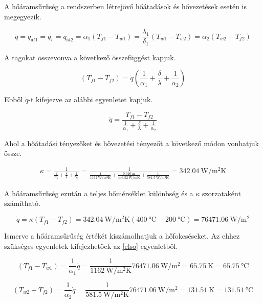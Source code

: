 \noindent A hőáramsűrűség a rendszerben létrejövő hőátadások és hővezetések esetén is megegyezik. 

\begin{equation}\label{elso}
\dot{q}=\dot{q}_{\textit{át1}} =\dot{q_v}=\dot{q}_{\textit{át2}}=\alpha_1 (T_{f1}-T_{w1})= \frac{\lambda_1}{\delta_1} (T_{w1} - T_{w2}) = \alpha_2 (T_{w2}-T_{f2})
\end{equation} 

\noindent A tagokat összevonva a következő összefüggést kapjuk.

\begin{equation}
(T_{f1}-T_{f2})=\dot{q}(\frac{1}{\alpha_1}+\frac{\delta}{\lambda}+\frac{1}{\alpha_2})
\end{equation} 

\noindent Ebből $\dot{q}$-t kifejezve az alábbi egyenletet kapjuk.

\begin{equation}
\dot{q}=\frac{T_{f1}-T_{f2}}{\frac{1}{\alpha_1}+\frac{\delta}{\lambda}+\frac{1}{\alpha_2}}
\end{equation} 

\noindent Ahol a hőátadási tényezőket és hővezetési tényezőt a következő módon vonhatjuk össze.

\begin{equation}
\begin{split}
\kappa=\frac{1}{\frac{1}{\alpha_1}+\frac{\delta}{\lambda}+\frac{1}{\alpha_2}}
=\frac{1}{\frac{1}{\SI{1162}{\watt\per\meter\squared\kelvin}}+\frac{\SI {0,016}{\meter}}{\SI{446,52}{\watt\per\meter\kelvin}}+\frac{1}{\SI{581,5}{\watt\per\meter\squared\kelvin}}}
=\SI{342,04}{\watt\per\meter\squared\kelvin}
\end{split}
\end{equation} 

\noindent A hőáramsűrűség ezután a teljes hőmérséklet különbség és a $\kappa$ szorzataként számítható.

\begin{equation}
\dot{q}=\kappa(T_{f1}-T_{f2})=\SI{342,04}{\watt\per\meter\squared\kelvin}(\SI{400}{\degreeCelsius}-\SI{200}{\degreeCelsius})=\SI{76471,06}{\watt\per\meter\squared}
\end{equation}

\noindent Ismerve a hőáramsűrűség értékét kiszámolhatjuk a hőfokeséseket. Az ehhez szükséges egyenletek kifejezhetőek az \ref{elso} egyenletből.

\begin{equation}
(T_{f1}-T_{w1})=\frac{1}{\alpha_1}\dot{q}=\frac{1}{\SI{1162}{\watt\per\meter\squared\kelvin}}\SI{76471,06}{\watt\per\meter\squared}=\SI{65,75}{\kelvin}=\SI{65,75}{\degreeCelsius}
\end{equation}

\begin{equation}
(T_{w2}-T_{f2})=\frac{1}{\alpha_2}\dot{q}=\frac{1}{\SI{581,5}{\watt\per\meter\squared\kelvin}}\SI{76471,06}{\watt\per\meter\squared}=\SI{131,51}{\kelvin}=\SI{131,51}{\degreeCelsius}
\end{equation}
